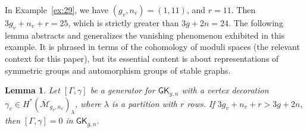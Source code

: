 \documentclass[12pt]{amsart}
\newtheorem{lem}[thm]{Lemma}
\theoremstyle{definition}
\numberwithin{equation}{section}
\newcommand{\M}{\mathcal{M}}
\newcommand{\Mb}{\overline{\M}}
\theoremstyle{definition} %
\theoremstyle{remark}
\newcommand{\GK}{\mathsf{GK}}
\begin{document}
In Example~\ref{ex:29}, we have $(g_v,n_v) = (1,11)$, and $r = 11$. Then $3g_v + n_v + r = 25$, which is strictly greater than $3g + 2n = 24$.  The following lemma abstracts and generalizes the vanishing phenomenon exhibited in this example. It is phrased in terms of the cohomology of moduli spaces (the relevant context for this paper), but its essential content is about representations of symmetric groups and automorphism groups of stable graphs.

\begin{lem} \label{lem:excess}
Let $[\Gamma,\gamma]$ be a generator for $\GK_{g,n}$ with a vertex decoration $\gamma_v \in H^*(\Mb_{g_v, n_v})_\lambda$, where $\lambda$ is a partition with $r$ rows. If $3g_v + n_v + r > 3g + 2n,$ then $[\Gamma,\gamma] = 0$ in $\GK_{g,n}$.
\end{lem}
\end{document}
